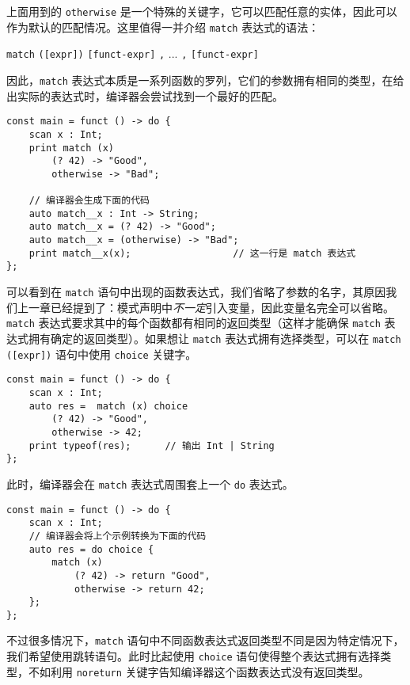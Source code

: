 上面用到的 \lstinline!otherwise! 是一个特殊的关键字，它可以匹配任意的实体，因此可以作为默认的匹配情况。这里值得一并介绍 \lstinline!match! 表达式的语法：

\begin{grammar} \label{grm:match-expression}
    \lstinline!match! \texttt{([expr])} \texttt{[funct-expr]} \lstinline!,! ... \lstinline!,! \texttt{[funct-expr]}
\end{grammar}

因此，\lstinline!match! 表达式本质是一系列函数的罗列，它们的参数拥有相同的类型，在给出实际的表达式时，编译器会尝试找到一个最好的匹配。

\begin{lstlisting}
const main = funct () -> do {
    scan x : Int;
    print match (x)
        (? 42) -> "Good",
        otherwise -> "Bad";

    // 编译器会生成下面的代码
    auto match__x : Int -> String;
    auto match__x = (? 42) -> "Good";
    auto match__x = (otherwise) -> "Bad";
    print match__x(x);					// 这一行是 match 表达式
};
\end{lstlisting}

可以看到在 \lstinline!match! 语句中出现的函数表达式，我们省略了参数的名字，其原因我们上一章已经提到了：模式声明中\emph{不一定}引入变量，因此变量名完全可以省略。 \\

\lstinline!match! 表达式要求其中的每个函数都有相同的返回类型（这样才能确保 \lstinline!match! 表达式拥有确定的返回类型）。如果想让 \lstinline!match! 表达式拥有选择类型，可以在 \lstinline!match ([expr])! 语句中使用 \lstinline!choice! 关键字。

\pagebreak

\begin{lstlisting}
const main = funct () -> do {
    scan x : Int;
    auto res =  match (x) choice
        (? 42) -> "Good",
        otherwise -> 42;
    print typeof(res);      // 输出 Int | String
};
\end{lstlisting}

此时，编译器会在 \lstinline!match! 表达式周围套上一个 \lstinline!do! 表达式。

\begin{lstlisting}
const main = funct () -> do {
	scan x : Int;
	// 编译器会将上个示例转换为下面的代码
	auto res = do choice {
		match (x)
			(? 42) -> return "Good",
			otherwise -> return 42;
	};
};
\end{lstlisting}

不过很多情况下，\lstinline!match! 语句中不同函数表达式返回类型不同是因为特定情况下，我们希望使用跳转语句。此时比起使用 \lstinline!choice! 语句使得整个表达式拥有选择类型，不如利用 \lstinline!noreturn! 关键字告知编译器这个函数表达式没有返回类型。

